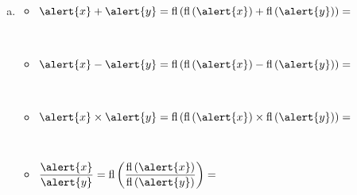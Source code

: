 \begin{frame}

	\begin{solution}
		\begin{enumerate}[c)]

			\item

			      \begin{multicols}{2}
				      \begin{itemize}
					      \item

					            \begin{math}
						            \alert{x}+\alert{y}=
						            \operatorname{fl}
						            \left(
						            \operatorname{fl}\left(\alert{x}\right)+
						            \operatorname{fl}\left(\alert{y}\right)
						            \right)=
					            \end{math}

					            \

					      \item

					            \begin{math}
						            \alert{x}-\alert{y}=
						            \operatorname{fl}
						            \left(
						            \operatorname{fl}\left(\alert{x}\right)-
						            \operatorname{fl}\left(\alert{y}\right)
						            \right)=
					            \end{math}

					            \

					      \item

					            \begin{math}
						            \alert{x}\times\alert{y}=
						            \operatorname{fl}
						            \left(
						            \operatorname{fl}\left(\alert{x}\right)\times
						            \operatorname{fl}\left(\alert{y}\right)
						            \right)=
					            \end{math}

					            \

					      \item

					            \begin{math}
						            \dfrac{\alert{x}}{\alert{y}}=
						            \operatorname{fl}
						            \left(
						            \dfrac{
							            \operatorname{fl}\left(\alert{x}\right)
						            }{
							            \operatorname{fl}\left(\alert{y}\right)
						            }
						            \right)=
					            \end{math}
				      \end{itemize}
			      \end{multicols}
		\end{enumerate}


\end{solution}
\end{frame}
